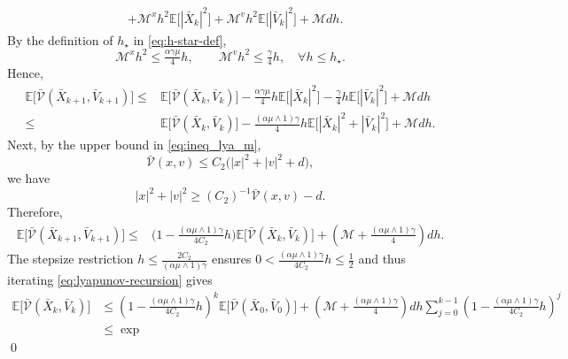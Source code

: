 \documentclass[12pt]{article}
\numberwithin{equation}{section}
\renewenvironment{proof}%
  {\begin{trivlist}%
   \item[]\ignorespaces}%
  {\qed\end{trivlist}}
\newcommand{\M}{\mathcal{M}}
\begin{document}
\begin{proof}
\begin{equation}
\begin{aligned}
&+
\M^x h^2
\mathbb E
\Big[
|\bar X_k|^2
\Big]
+
\M^v h^2
\mathbb E
\Big[
|\bar V_k|^2
\Big]
+
\M dh .
\end{aligned}
\end{equation}
By the definition of $h_\star$ in \eqref{eq:h-star-def},
\[
\M^x h^2
\leq
\tfrac{\alpha\gamma\mu}{4}h,
\qquad
\M^v h^2
\leq
\tfrac{\gamma}{4}h,
\quad
\forall h\leq h_\star.
\]
Hence,
\begin{equation}
\label{eq:lyapunov-drift-moment}
\begin{aligned}
\mathbb E
\Big[
\bar{\mathcal V}(\bar X_{k+1},\bar V_{k+1})
\Big]
\leq&
\mathbb E
\Big[
\bar{\mathcal V}(\bar X_k,\bar V_k)
\Big]
-
\tfrac{\alpha\gamma\mu}{4}h
\mathbb E
\Big[
|\bar X_k|^2
\Big]
-
\tfrac{\gamma}{4}h
\mathbb E
\Big[
|\bar V_k|^2
\Big]
+
\M dh
\\
\leq&
\mathbb E
\Big[
\bar{\mathcal V}(\bar X_k,\bar V_k)
\Big]
-
\tfrac{(\alpha\mu \wedge 1) \gamma }{4}h
\mathbb E
\Big[
|\bar X_k|^2+|\bar V_k|^2
\Big]
+
\M dh.
\end{aligned}
\end{equation}
Next, by the upper bound in \eqref{eq:ineq_lya_m},
\[
\bar{\mathcal V}(x,v)
\leq
C_2
\big(
|x|^2+|v|^2+d
\big),
\]
we have
\[
|x|^2+|v|^2
\geq
(C_2)^{-1}\bar{\mathcal V}(x,v)-d.
\]
Therefore,
\begin{equation}
\label{eq:lyapunov-recursion}
\begin{aligned}
\mathbb E
\Big[
\bar{\mathcal V}(\bar X_{k+1},\bar V_{k+1})
\Big]
\leq&
\big(
1-
\tfrac{(\alpha\mu \wedge 1) \gamma}{4C_2}h
\big)
\mathbb E
\Big[
\bar{\mathcal V}(\bar X_k,\bar V_k)
\Big]
+
\left(
\M
+
\tfrac{(\alpha\mu \wedge 1) \gamma}{4}
\right)dh.
\end{aligned}
\end{equation}
The stepsize restriction
\(
h\leq
\tfrac{2C_2}{(\alpha\mu \wedge 1) \gamma}
\)
ensures
\(
0
<
\tfrac{(\alpha\mu \wedge 1) \gamma}{4C_2}h
\leq
\tfrac12
\)
and thus iterating \eqref{eq:lyapunov-recursion} gives
\begin{equation}
\label{eq:lyapunov-iteration}
\begin{aligned}
\mathbb E
\Big[
\bar{\mathcal V}(\bar X_k,\bar V_k)
\Big]
&\leq
\left(
1-
\tfrac{(\alpha\mu \wedge 1) \gamma}{4C_2}h
\right)^k
\mathbb E
\Big[
\bar{\mathcal V}(\bar X_0,\bar V_0)
\Big]
+
\left(
\M
+
\tfrac{(\alpha\mu \wedge 1) \gamma}{4}
\right)dh
\sum_{j=0}^{k-1}
\left(
1-
\tfrac{(\alpha\mu \wedge 1) \gamma}{4C_2}h
\right)^j
\\
&\leq
\exp

\end{aligned}
\end{equation}
\end{proof}
\end{document}

